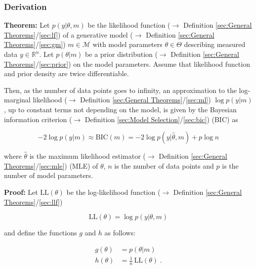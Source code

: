 \documentclass[a4paper,12pt,twoside]{book}
\begin{document}
\subsubsection[\textbf{Derivation}]{Derivation} \label{sec:bic-der}
\setcounter{equation}{0}

\textbf{Theorem:} Let $p(y \vert \theta, m)$ be the likelihood function ($\rightarrow$ Definition \ref{sec:General Theorems}/\ref{sec:lf}) of a generative model ($\rightarrow$ Definition \ref{sec:General Theorems}/\ref{sec:gm}) $m \in \mathcal{M}$ with model parameters $\theta \in \Theta$ describing measured data $y \in \mathbb{R}^n$. Let $p(\theta \vert m)$ be a prior distribution ($\rightarrow$ Definition \ref{sec:General Theorems}/\ref{sec:prior}) on the model parameters. Assume that likelihood function and prior density are twice differentiable.

Then, as the number of data points goes to infinity, an approximation to the log-marginal likelihood ($\rightarrow$ Definition \ref{sec:General Theorems}/\ref{sec:ml}) $\log p(y \vert m)$, up to constant terms not depending on the model, is given by the Bayesian information criterion ($\rightarrow$ Definition \ref{sec:Model Selection}/\ref{sec:bic}) (BIC) as

\begin{equation} \label{eq:bic-der-BIC}
-2 \log p(y|m) \approx \mathrm{BIC}(m) = -2 \log p(y|\hat{\theta}, m) + p \log n
\end{equation}

where $\hat{\theta}$ is the maximum likelihood estimator ($\rightarrow$ Definition \ref{sec:General Theorems}/\ref{sec:mle}) (MLE) of $\theta$, $n$ is the number of data points and $p$ is the number of model parameters.


\vspace{1em}
\textbf{Proof:} Let $\mathrm{LL}(\theta)$ be the log-likelihood function ($\rightarrow$ Definition \ref{sec:General Theorems}/\ref{sec:llf})

\begin{equation} \label{eq:bic-der-LL}
\mathrm{LL}(\theta) = \log p(y|\theta,m)
\end{equation}

and define the functions $g$ and $h$ as follows:

\begin{equation} \label{eq:bic-der-gh}
\begin{split}
g(\theta) &= p(\theta|m) \\
h(\theta) &= \frac{1}{n} \, \mathrm{LL}(\theta) \; .
\end{split}
\end{equation}
\end{document}
